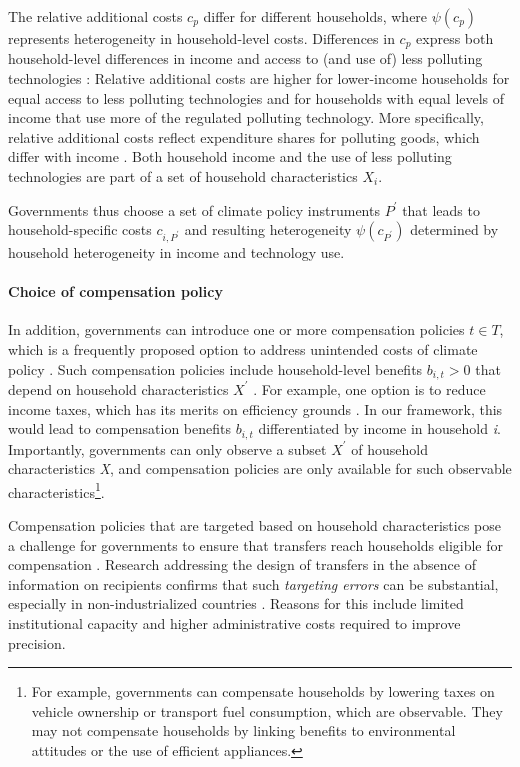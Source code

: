 \documentclass[12pt, a4paper]{article}
\begin{document}
The relative additional costs $c_{p}$ differ for different households, where $\psi(c_{p})$ represents heterogeneity in household-level costs. Differences in $c_{p}$ express both household-level differences in income and access to (and use of) less polluting technologies \autocite{Hansel.2022}: Relative additional costs are higher for lower-income households for equal access to less polluting technologies and for households with equal levels of income that use more of the regulated polluting technology. More specifically, relative additional costs reflect expenditure shares for polluting goods, which differ with income \autocite{Jacobs.2019,Dorband.2019}. Both household income and the use of less polluting technologies are part of a set of household characteristics $X_{i}$. 

Governments thus choose a set of climate policy instruments $P^{\prime}$ that leads to household-specific costs $c_{i,P^{\prime}}$ and resulting heterogeneity $\psi(c_{P^{\prime}})$ determined by household heterogeneity in income and technology use.

\paragraph{Choice of compensation policy}
In addition, governments can introduce one or more compensation policies $t \in T$, which is a frequently proposed option to address unintended costs of climate policy \autocite{Klenert.2018,Baranzini.2017}. Such compensation policies include household-level benefits $b_{i,t}>0$ that depend on household characteristics $X^{\prime}$ \autocite[e.g.,][]{Akerlof.1978}. For example, one option is to reduce income taxes, which has its merits on efficiency grounds \autocite{Pearce.1991,Goulder.1995,Bento.2018}. In our framework, this would lead to compensation benefits $b_{i,t}$ differentiated by income in household \textit{i}. Importantly, governments can only observe a subset $X^{\prime}$ of household characteristics \textit{X}, and compensation policies are only available for such observable characteristics\footnote{For example, governments can compensate households by lowering taxes on vehicle ownership or transport fuel consumption, which are observable. They may not compensate households by linking benefits to environmental attitudes or the use of efficient appliances.}. 

Compensation policies that are targeted based on household characteristics pose a challenge for governments to ensure that transfers reach households eligible for compensation \autocite[e.g.,][]{Hanna.2018}. Research addressing the design of transfers in the absence of information on recipients confirms that such \textit{targeting errors} can be substantial, especially in non-industrialized countries \autocite{WorldBank.2018, Robles.2019,Bah.2019}. Reasons for this include limited institutional capacity \autocite[e.g.,][]{Besley.2009} and higher administrative costs \autocite{Coady.2004} required to improve precision.
\end{document}

